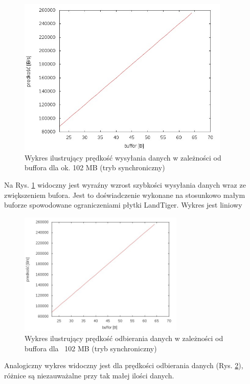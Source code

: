 \documentclass{BscUS}
\begin{document}
\begin{figure}[H]
{
\centering
\includegraphics[width=0.9\textwidth]{./img/S_107374200Send}
\caption{Wykres ilustrujący prędkość wysyłania danych w zależności od buffora dla ok. 102 MB (tryb synchroniczny)}
\label{fig:S_107374200Send}
}
\end{figure}
\noindent Na Rys. \ref{fig:S_107374200Send} widoczny jest wyraźny wzrost szybkości wysyłania danych wraz ze zwiększeniem bufora. Jest to doświadczenie wykonane na stosunkowo małym buforze spowodowane ograniczeniami płytki LandTiger. Wykres jest liniowy 
\begin{figure}[H]
{
\centering
\includegraphics[width=0.7\textwidth]{./img/S_107374200Receive}
\caption{Wykres ilustrujący prędkość odbierania danych w zależności od buffora dla ~102 MB (tryb synchroniczny)}
\label{fig:S_107374200Receive}
}
\end{figure}
\noindent Analogiczny wykres widoczny jest dla prędkości odbierania danych (Rys. \ref{fig:S_107374200Receive}), różnice są niezauważalne przy tak małej ilości danych.
\end{document}
